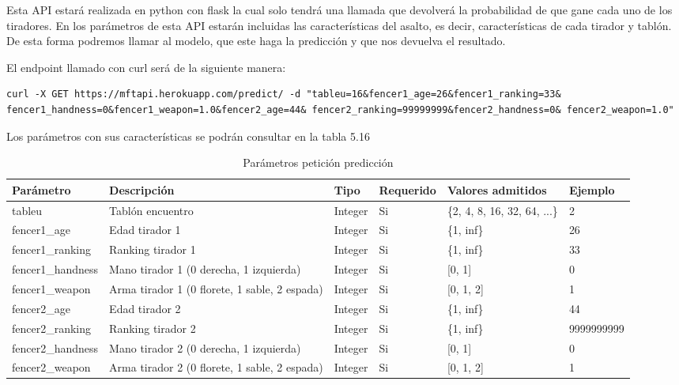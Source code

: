 Esta API estará realizada en python con flask la cual solo tendrá una llamada que devolverá
la probabilidad de que gane cada uno de los tiradores. En los parámetros de esta API estarán
incluidas las características del asalto, es decir, características de cada tirador y tablón.
De esta forma podremos llamar al modelo, que este haga la predicción y que nos
devuelva el resultado.

El endpoint llamado con curl será de la siguiente manera:

\begin{lstlisting}
curl -X GET https://mftapi.herokuapp.com/predict/ -d "tableu=16&fencer1_age=26&fencer1_ranking=33& fencer1_handness=0&fencer1_weapon=1.0&fencer2_age=44& fencer2_ranking=99999999&fencer2_handness=0& fencer2_weapon=1.0"
\end{lstlisting}

Los parámetros con sus características se podrán consultar en la tabla 5.16


\begin{table}[]
  \centering
  \caption{Parámetros petición predicción}
  \label{tab: Parmetros peticin prediccin}
  \begin{tabular}{llllll}
    Parámetro & Descripción & Tipo & Requerido & Valores admitidos & Ejemplo \\ \hline
    \multicolumn{1}{l|}{tableu} & Tablón encuentro & Integer & Si & \{2, 4, 8, 16, 32, 64, ...\} & 2 \\ \hline
    \multicolumn{1}{l|}{fencer1\_age} & Edad tirador 1 & Integer & Si & \{1, inf\} & 26 \\ \hline
    \multicolumn{1}{l|}{fencer1\_ranking} & Ranking tirador 1 & Integer & Si & \{1, inf\} & 33 \\ \hline
    \multicolumn{1}{l|}{fencer1\_handness} & Mano tirador 1 (0 derecha, 1 izquierda) & Integer & Si & {[}0, 1{]} & 0 \\ \hline
    \multicolumn{1}{l|}{fencer1\_weapon} & Arma tirador 1 (0 florete, 1 sable, 2 espada) & Integer & Si & {[}0, 1, 2{]} & 1 \\ \hline
    fencer2\_age & \multicolumn{1}{l|}{Edad tirador 2} & Integer & Si & \{1, inf\} & 44 \\ \hline
    fencer2\_ranking & \multicolumn{1}{l|}{Ranking tirador 2} & Integer & Si & \{1, inf\} & 9999999999 \\ \hline
    fencer2\_handness & \multicolumn{1}{l|}{Mano tirador 2 (0 derecha, 1 izquierda)} & Integer & Si & {[}0, 1{]} & 0 \\ \hline
    fencer2\_weapon & \multicolumn{1}{l|}{Arma tirador 2 (0 florete, 1 sable, 2 espada)} & Integer & Si & {[}0, 1, 2{]} & 1
  \end{tabular}
\end{table}

